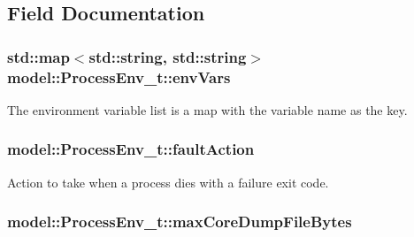 \subsection{Field Documentation}
\subsubsection[{\texorpdfstring{env\+Vars}{envVars}}]{\setlength{\rightskip}{0pt plus 5cm}std\+::map$<$std\+::string, std\+::string$>$ model\+::\+Process\+Env\+\_\+t\+::env\+Vars}\hypertarget{structmodel_1_1_process_env__t_a66614cecb7ca5a8d65f00b9ac7baea33}{}\label{structmodel_1_1_process_env__t_a66614cecb7ca5a8d65f00b9ac7baea33}


The environment variable list is a map with the variable name as the key. 

\subsubsection[{\texorpdfstring{fault\+Action}{faultAction}}]{ model\+::\+Process\+Env\+\_\+t\+::fault\+Action}\hypertarget{structmodel_1_1_process_env__t_a8e9af93f8d44d2d8a1385e681021238f}{}\label{structmodel_1_1_process_env__t_a8e9af93f8d44d2d8a1385e681021238f}


Action to take when a process dies with a failure exit code. 

\subsubsection[{\texorpdfstring{max\+Core\+Dump\+File\+Bytes}{maxCoreDumpFileBytes}}]{ model\+::\+Process\+Env\+\_\+t\+::max\+Core\+Dump\+File\+Bytes}\hypertarget{structmodel_1_1_process_env__t_a00d402d603b89ce5d4319f3e3504aa5d}{}\label{structmodel_1_1_process_env__t_a00d402d603b89ce5d4319f3e3504aa5d}


